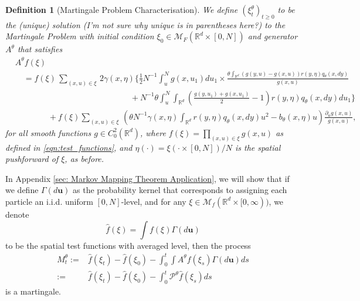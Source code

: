 \documentclass[12pt]{article}
\newtheorem{definition}[theorem]{Definition}
\def \hat{\widehat}
\newcommand{\IR}{\mathbb R}
\newcommand{\Pgen}{\mathcal{P}}    %
\newcommand{\lp}{\xi}              %
\newcommand{\comment}[1]{{\color{blue} \it #1}}
\begin{document}
\begin{definition}[Martingale Problem Characterisation]
    \label{defn:lookdown_mgale}
We define $(\lp^{\theta}_t)_{t \geq 0}$
to be the (unique) solution
    \comment{(I'm not sure why unique is in parentheses here?)}
to the Martingale Problem
with initial condition $\lp_0 \in \mathcal{M}_F(\mathbb{R}^d \times [0,N])$
and generator $A^{\theta}$ that satisfies
\begin{equation*}
\begin{split}
& A^{\theta}f(\lp ) \\
&\quad =
    f(\lp)
    \,\sum_{(x,u)\in \lp}\,
    2 \gamma(x, \eta)
    \Bigg\{ \frac 12 N^{-1}\int_u^N g(x,u_1) du_1
            \times
            \frac{
                \theta \int_{\mathbb{R}^d}
                (g(y,u) - g(x,u))
                r(y, \eta) q_{\theta}(x,dy)
            }{ g(x,u) }
        \\
    &\qquad\qquad\qquad\qquad\qquad\qquad\qquad {} +
        N^{-1}\theta\int_u^N
        \int_{\mathbb{R}^d}\left(
            \frac{ g(y,u_1) + g(x,u_1) }{ 2 } - 1
        \right)
        r(y, \eta) q_{\theta}(x,dy)
        du_1
    \Bigg\}\\
    &\qquad\qquad {} +
    f(\lp) \sum_{(x,u)\in\lp}\,
    \left(
        \theta N^{-1} \gamma(x,\eta) \int_{\IR^d} r(y, \eta) q_\theta(x, dy) u^2 -b_{\theta}(x,\eta)u
    \right)
    \frac{\partial_u g(x,u)}{g(x,u)}
    ,
\end{split}
\end{equation*}
for all smooth functions $g \in C^{2}_{0}(\mathbb{R}^d)$,
where $f(\lp) = \prod_{(x, u) \in \lp} g(x, u)$ as defined in \eqref{eqn:test_functions},
and $\eta(\cdot) = \lp(\cdot \times [0, N]) / N$ is the spatial pushforward of $\lp$,
as before.
\end{definition}


In Appendix \ref{sec: Markov Mapping Theorem Application},
we will show that
if we define $\Gamma (d\textbf{u})$
as the probability kernel that corresponds to
assigning each particle an i.i.d. uniform $[0,N]$-level,
and for any $\lp \in \mathcal{M}_f(\mathbb{R}^d \times [0,\infty))$, we denote
$$\hat{f}(\lp)=\int f(\lp) \Gamma (d\textbf{u})$$ 
to be the spatial test functions with averaged level,
then the process
\begin{equation}
\begin{aligned}
M^{\theta}_t:=&\hat{f}(\lp_t)-\hat{f}(\lp_0)-\int_{0}^{t}\int   A^{\theta}f(\lp_s)\Gamma(d\textbf{u})ds\\
:=&\hat{f}(\lp_t)-\hat{f}(\lp_0)-\int_{0}^{t}   \Pgen^{\theta}\hat{f}(\lp_s)ds
\end{aligned}    
\end{equation}
is a martingale.
\end{document}
